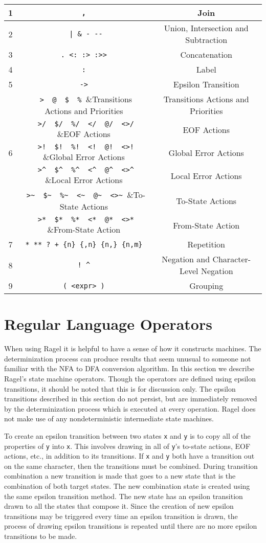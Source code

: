 \documentclass[letterpaper,11pt,oneside]{book}
\newcommand{\verbspace}{\vspace{10pt}}
\begin{document}
\verbspace
\begin{tabular}{|c|c|c|}
\hline
1&\verb| , |&Join\\
\hline
2&\verb/ | & - --/&Union, Intersection and Subtraction\\
\hline
3&\verb| . <: :> :>> |&Concatenation\\
\hline
4&\verb| : |&Label\\
\hline
5&\verb| -> |&Epsilon Transition\\
\hline
&\verb| >  @  $  % |&Transitions Actions and Priorities\\
\cline{2-3}
&\verb| >/  $/  %/  </  @/  <>/ |&EOF Actions\\
\cline{2-3}
6&\verb| >!  $!  %!  <!  @!  <>! |&Global Error Actions\\
\cline{2-3}
&\verb| >^  $^  %^  <^  @^  <>^ |&Local Error Actions\\
\cline{2-3}
&\verb| >~  $~  %~  <~  @~  <>~ |&To-State Actions\\
\cline{2-3}
&\verb| >*  $*  %*  <*  @*  <>* |&From-State Action\\
\hline
7&\verb| * ** ? + {n} {,n} {n,} {n,m} |&Repetition\\
\hline
8&\verb| ! ^ |&Negation and Character-Level Negation\\
\hline
9&\verb| ( <expr> ) |&Grouping\\
\hline
\end{tabular}

\section{Regular Language Operators}
\label{machconst}

When using Ragel it is helpful to have a sense of how it constructs machines.
The determinization process can produce results that seem unusual to someone
not familiar with the NFA to DFA conversion algorithm. In this section we
describe Ragel's state machine operators. Though the operators are defined
using epsilon transitions, it should be noted that this is for discussion only.
The epsilon transitions described in this section do not persist, but are
immediately removed by the determinization process which is executed at every
operation. Ragel does not make use of any nondeterministic intermediate state
machines. 

To create an epsilon transition between two states \verb|x| and \verb|y| is to
copy all of the properties of \verb|y| into \verb|x|. This involves drawing in
all of \verb|y|'s to-state actions, EOF actions, etc., in addition to its
transitions. If \verb|x| and \verb|y| both have a transition out on the same
character, then the transitions must be combined.  During transition
combination a new transition is made that goes to a new state that is the
combination of both target states. The new combination state is created using
the same epsilon transition method.  The new state has an epsilon transition
drawn to all the states that compose it. Since the creation of new epsilon
transitions may be triggered every time an epsilon transition is drawn, the
process of drawing epsilon transitions is repeated until there are no more
epsilon transitions to be made.
\end{document}
